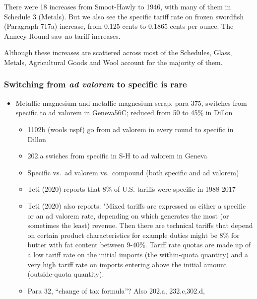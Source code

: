 \documentclass[
  12pt,
]{article}
\begin{document}
There were 18 increases from Smoot-Hawly to 1946, with many of them in Schedule 3 (Metals). But we also see the specific tariff rate on frozen swordfish (Paragraph 717a) increase, from 0.125 cents to 0.1865 cents per ounce. The Annecy Round saw no tariff increases.

Although these increases are scattered across most of the Schedules, Glass, Metals, Agricultural Goods and Wool account for the majority of them.

\hypertarget{switching-from-ad-valorem-to-specific-is-rare}{%
\subsubsection{\texorpdfstring{Switching from \emph{ad valorem} to specific is rare}{Switching from ad valorem to specific is rare}}\label{switching-from-ad-valorem-to-specific-is-rare}}

\begin{itemize}
\item
  Metallic magnesium and metallic magnesium scrap, para 375, switches from specific to ad valorem in Geneva56C; reduced from 50 to 45\% in Dillon

  \begin{itemize}
  \item
    1102b (wools nspf) go from ad valorem in every round to specific in Dillon
  \item
    202.a swiches from specific in S-H to ad valorem in Geneva
  \item
    Specific vs.~ad valorem vs.~compound (both specific and ad valorem)
  \item
    Teti (2020) reports that 8\% of U.S. tariffs were specific in 1988-2017
  \item
    Teti (2020) also reports: "Mixed tariffs are expressed as either a specific or an ad valorem rate, depending on which generates the most (or sometimes the least) revenue. Then there are technical tariffs that depend on certain product characteristics for example duties might be 8\% for butter with fat content between 9-40\%. Tariff rate quotas are made up of a low tariff rate on the initial imports (the within-quota quantity) and a very high tariff rate on imports entering above the initial amount (outside-quota quantity).
  \item
    Para 32, ``change of tax formula''? Also 202.a, 232.c,302.d,
  \end{itemize}
\end{itemize}
\end{document}
